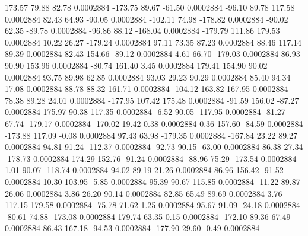       173.57       79.88       82.78     0.0002884
     -173.75       89.67      -61.50     0.0002884
      -96.10       89.78      117.58     0.0002884
       82.43       64.93      -90.05     0.0002884
     -102.11       74.98     -178.82     0.0002884
      -90.02       62.35      -89.78     0.0002884
      -96.86       88.12     -168.04     0.0002884
     -179.79      111.86      179.53     0.0002884
       10.22       26.27     -179.24     0.0002884
       97.11       73.35       87.23     0.0002884
       88.46      117.14       89.39     0.0002884
       82.43      154.66      -89.12     0.0002884
        4.61       66.70     -179.03     0.0002884
       86.93       90.90      153.96     0.0002884
      -80.74      161.40        3.45     0.0002884
      179.41      154.90       90.02     0.0002884
       93.75       89.98       62.85     0.0002884
       93.03       29.23       90.29     0.0002884
       85.40       94.34       17.08     0.0002884
       88.78       88.32      161.71     0.0002884
     -104.12      163.82      167.95     0.0002884
       78.38       89.28       24.01     0.0002884
     -177.95      107.42      175.48     0.0002884
      -91.59      156.02      -87.27     0.0002884
      175.97       90.38      117.35     0.0002884
       -6.52       90.05     -117.95     0.0002884
      -81.27       67.74     -179.17     0.0002884
     -170.02       19.42        0.38     0.0002884
        0.36      157.60      -84.59     0.0002884
     -173.88      117.09       -0.08     0.0002884
       97.43       63.98     -179.35     0.0002884
     -167.84       23.22       89.27     0.0002884
       94.81       91.24     -112.37     0.0002884
      -92.73       90.15      -63.00     0.0002884
       86.38       27.34     -178.73     0.0002884
      174.29      152.76      -91.24     0.0002884
      -88.96       75.29     -173.54     0.0002884
        1.01       90.07     -118.74     0.0002884
       94.02       89.19       21.26     0.0002884
       86.96      156.42      -91.52     0.0002884
       10.30      103.95       -5.85     0.0002884
       95.39       90.67      115.85     0.0002884
      -11.22       89.87       26.06     0.0002884
        3.86       26.20       90.14     0.0002884
       82.85       65.49       89.69     0.0002884
        3.76      117.15      179.58     0.0002884
      -75.78       71.62        1.25     0.0002884
       95.67       91.09      -24.18     0.0002884
      -80.61       74.88     -173.08     0.0002884
      179.74       63.35        0.15     0.0002884
     -172.10       89.36       67.49     0.0002884
       86.43      167.18      -94.53     0.0002884
     -177.90       29.60       -0.49     0.0002884
